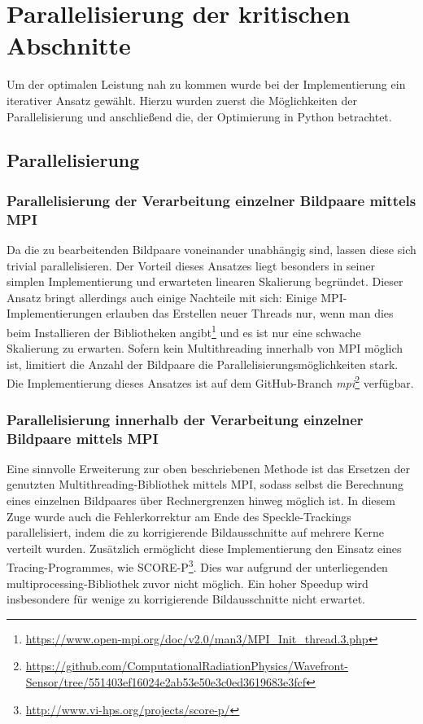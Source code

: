 \chapter{Parallelisierung der kritischen Abschnitte}

Um der optimalen Leistung nah zu kommen wurde bei der Implementierung ein iterativer Ansatz gewählt. Hierzu wurden zuerst die Möglichkeiten der Parallelisierung und anschließend die, der Optimierung in Python betrachtet. 

\section{Parallelisierung}

\subsection{Parallelisierung der Verarbeitung einzelner Bildpaare mittels MPI}

Da die zu bearbeitenden Bildpaare voneinander unabhängig sind, lassen diese sich trivial parallelisieren. Der Vorteil dieses Ansatzes liegt besonders in seiner simplen Implementierung und erwarteten linearen Skalierung begründet. Dieser Ansatz bringt allerdings auch einige Nachteile mit sich: Einige \gls{MPI}-Implementierungen erlauben das Erstellen neuer Threads nur, wenn man dies beim Installieren der Bibliotheken angibt\footnote{\url{https://www.open-mpi.org/doc/v2.0/man3/MPI_Init_thread.3.php}} und es ist nur eine schwache Skalierung zu erwarten. Sofern kein Multithreading innerhalb von \gls{MPI} möglich ist, limitiert die Anzahl der Bildpaare die Parallelisierungsmöglichkeiten stark. Die Implementierung dieses Ansatzes ist auf dem GitHub-Branch \textit{mpi}\footnote{\url{https://github.com/ComputationalRadiationPhysics/Wavefront-Sensor/tree/551403ef16024e2ab53e50e3c0ed3619683e3fcf}} verfügbar.

\subsection{Parallelisierung innerhalb der Verarbeitung einzelner Bildpaare mittels MPI}

Eine sinnvolle Erweiterung zur oben beschriebenen Methode ist das Ersetzen der genutzten Mul\-ti\-threa\-ding-Bibliothek mittels MPI, sodass selbst die Berechnung eines einzelnen Bildpaares über Rechnergrenzen hinweg möglich ist. In diesem Zuge wurde auch die Fehlerkorrektur am Ende des Speckle-Trackings parallelisiert, indem die zu korrigierende Bildausschnitte auf mehrere Kerne verteilt wurden. Zusätzlich ermöglicht diese Implementierung den Einsatz eines Tracing-Programmes, wie SCORE-P\footnote{\url{http://www.vi-hps.org/projects/score-p/}}. Dies war aufgrund der unterliegenden multiprocessing-Bibliothek zuvor nicht möglich. Ein hoher Speedup wird insbesondere für wenige zu korrigierende Bildausschnitte nicht erwartet. 

